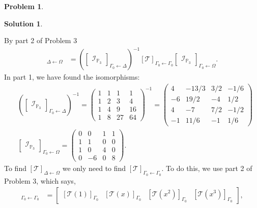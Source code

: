 \documentclass{article}
\theoremstyle{definition}
\newtheorem*{prob*}{Problem}
\newtheorem*{sln*}{Solution}
\newcommand{\T}{\mathcal{T}}
\begin{document}
\begin{prob*}
\begin{sln*}
\begin{enumerate}
\begin{enumerate}
				By part 2 of Problem 3
				\begin{align*}
				[\mathcal{T}]_{\Delta \leftarrow \Omega} &= 
				\left(\begin{bmatrix}
				\mathcal{I}_{\mathbb{P}_3}
				\end{bmatrix}_{\Gamma_0 \leftarrow \Delta}\right)^{-1} [\mathcal{T}]_{\Gamma_0 \leftarrow \Gamma_0} 
				\begin{bmatrix}
				\mathcal{I}_{\mathbb{P}_3}
				\end{bmatrix}_{\Gamma_0 \leftarrow \Omega}.
				\end{align*}
				In part 1, we have found the isomorphisms:
				\begin{align*}
				&\left(\begin{bmatrix}
				\mathcal{I}_{\mathbb{P}_3}
				\end{bmatrix}_{\Gamma_0 \leftarrow \Delta}\right)^{-1} = \begin{pmatrix}
				1&1&1&1\\
				1&2&3&4\\
				1&4&9&16\\
				1&8&27&64
				\end{pmatrix}^{-1} = 
				\begin{pmatrix}
				4&-13/3&3/2&-1/6\\
				-6&19/2&-4&1/2\\
				4&-7&7/2&-1/2\\
				-1&11/6&-1&1/6
				\end{pmatrix}\\
				&\begin{bmatrix}
				\mathcal{I}_{\mathbb{P}_3}
				\end{bmatrix}_{\Gamma_0 \leftarrow \Omega}
				= \begin{pmatrix}
				0&0&1&1\\
				1&1&0&0\\
				1&0&4&0\\
				0&-6&0&8
				\end{pmatrix}.
				\end{align*}
				To find $[\T]_{\Delta\leftarrow\Omega}$ we only need to find $[\T]_{\Gamma_0\leftarrow\Gamma_0}$. To do this, we use part 2 of Problem 3, which says,
				\begin{align*}
				[\T]_{\Gamma_0\leftarrow\Gamma_0} &= \begin{bmatrix}
				[\T(1)]_{\Gamma_0} & [\T(x)]_{\Gamma_0} & [\T(x^2)]_{\Gamma_0} & [\T(x^3)]_{\Gamma_0}
				\end{bmatrix},
				\end{align*}

\end{enumerate}
\end{enumerate}
\end{sln*}
\end{prob*}
\end{document}
